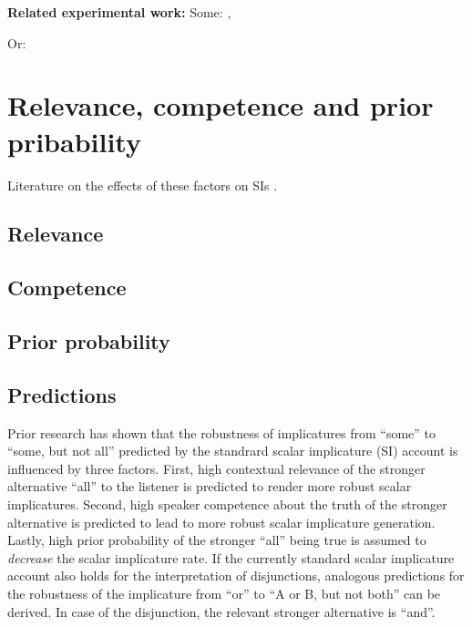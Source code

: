 \documentclass{sp}
\begin{document}
\textbf{Related experimental work: } 
Some: \citep{degen2015investigating}, 

Or: \citep{Li2021}

\section{Relevance, competence and prior pribability}
Literature on the effects of these factors on SIs \citep{sperber1986relevance, goodman2013knowledge, degen2015wonky}. 
\subsection{Relevance}

\subsection{Competence}

\subsection{Prior probability}

\subsection{Predictions}
Prior research has shown that the robustness of implicatures from ``some'' to ``some, but not all''  predicted by the standrard scalar implicature (SI) account is influenced by three factors. First, high contextual relevance of the stronger alternative ``all'' to the listener is predicted to render more robust scalar implicatures. Second, high speaker competence about the truth of the stronger alternative is predicted to lead to more robust scalar implicature generation. Lastly, high prior probability of the stronger ``all'' being true is assumed to \textit{decrease} the scalar implicature rate.
If the currently standard scalar implicature account also holds for the interpretation of disjunctions, analogous predictions for the robustness of the implicature from ``or'' to ``A or B, but not both'' can be derived. In case of the disjunction, the relevant stronger alternative is ``and''. 
\end{document}
